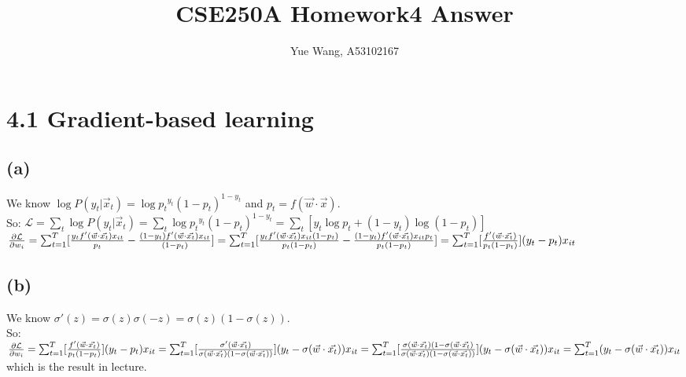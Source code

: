 \documentclass [11pt, a4paper, oneside] {article}
\author {Yue Wang, A53102167}
\title {CSE250A Homework4 Answer}
\begin{document}
\maketitle
\section *{4.1 Gradient-based learning}
\subsection *{(a)}
We know $\log P(y_t|\vec{x}_t) = \log {p_t}^{y_t}{(1-p_t)}^{1-y_t} $ and $p_t = f(\vec{w}\cdot\vec{x})$. \\So:
$\mathcal{L} = \sum_t \log P(y_t|\vec{x}_t) = \sum_t \log {p_t}^{y_t}{(1-p_t)}^{1-y_t} =\sum_t [y_t\log {p_t}+{(1-y_t)}\log{(1-p_t)}]$\\
$\frac{\partial{\mathcal{L}}}{\partial{w_i}} = \sum_{t=1}^{T}[\frac{y_t f'(\vec{w}\cdot\vec{x_t})x_{it}}{p_t} - \frac{(1-y_t)f'(\vec{w}\cdot\vec{x_t})x_{it}}{(1-p_t)}]
=  \sum_{t=1}^{T}[\frac{y_t f'(\vec{w}\cdot\vec{x_t})x_{it}(1-p_t)}{p_t(1-p_t)} - \frac{(1-y_t)f'(\vec{w}\cdot\vec{x_t})x_{it}p_t}{p_t(1-p_t)}]\\
=\sum_{t=1}^{T}[\frac{f'(\vec{w}\cdot\vec{x_t})}{p_t(1-p_t)}](y_t-p_t)x_{it}$
\subsection *{(b)}
We know $\sigma'(z) = \sigma(z)\sigma(-z) = \sigma(z)(1-\sigma(z))$.\\
So:\\
$\frac{\partial{\mathcal{L}}}{\partial{w_i}} = \sum_{t=1}^{T}[\frac{f'(\vec{w}\cdot\vec{x_t})}{p_t(1-p_t)}](y_t-p_t)x_{it} \\= 
\sum_{t=1}^{T}[\frac{\sigma'(\vec{w}\cdot\vec{x_t})}{\sigma(\vec{w}\cdot\vec{x_t})(1-\sigma(\vec{w}\cdot\vec{x_t}))}](y_t-\sigma(\vec{w}\cdot\vec{x_t}))x_{it}\\
= \sum_{t=1}^{T}[\frac{\sigma(\vec{w}\cdot\vec{x_t})(1-\sigma(\vec{w}\cdot\vec{x_t})}{\sigma(\vec{w}\cdot\vec{x_t})(1-\sigma(\vec{w}\cdot\vec{x_t}))}](y_t-\sigma(\vec{w}\cdot\vec{x_t}))x_{it} \\= \sum_{t=1}^{T}(y_t-\sigma(\vec{w}\cdot\vec{x_t}))x_{it}$\\
which is the result in lecture.\\
\end{document}
